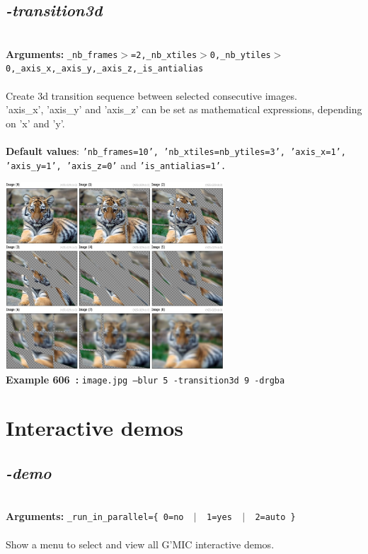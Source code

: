 \documentclass[a4paper,11pt,twoside]{book}
\begin{document}
\subsection{\emph{-transition3d} }\vspace*{-0.5em}
~\\\textbf{Arguments: } 
{\small \texttt{\_nb\_frames$>$=2,\_nb\_xtiles$>$0,\_nb\_ytiles$>$0,\_axis\_x,\_axis\_y,\_axis\_z,\_is\_antialias}}\\~\\
Create 3d transition sequence between selected consecutive images.
~\\'axis\_x', 'axis\_y' and 'axis\_z' can be set as mathematical expressions, depending on 'x' and 'y'.
~\\~\\\textbf{Default values}: {\small \texttt{'nb\_frames=10', 'nb\_xtiles=nb\_ytiles=3', 'axis\_x=1', 'axis\_y=1', 'axis\_z=0'} and \texttt{'is\_antialias=1'.}}
\begin{center}\includegraphics[keepaspectratio=true,height=7cm,width=\textwidth]{img/gmic_def606.jpg}\\
{\footnotesize \textbf{Example 606~:} \texttt{image.jpg --blur 5 -transition3d 9 -drgba}}
\end{center}
\section{Interactive demos}


\subsection{\emph{-demo} }\vspace*{-0.5em}
~\\\textbf{Arguments: } 
{\small \texttt{\_run\_in\_parallel=\{ 0=no ~$|$~ 1=yes ~$|$~ 2=auto \}}}\\~\\
Show a menu to select and view all G'MIC interactive demos.
\end{document}
